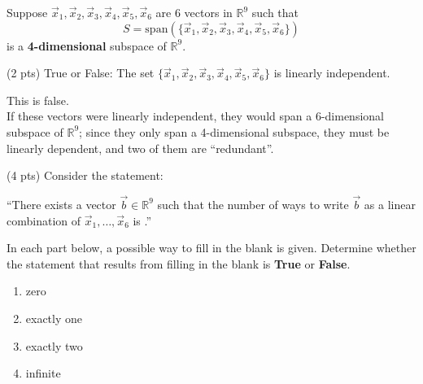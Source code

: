 \documentclass[11pt]{article}
\begin{document}
\newpage

\begin{prob}[(14 pts)]
Suppose $\vec x_1, \vec x_2, \vec x_3, \vec x_4, \vec x_5, \vec x_6$ are 6 vectors in $\mathbb{R}^9$ such that $$S = \text{span}\left(\{\vec x_1, \vec x_2, \vec x_3, \vec x_4, \vec x_5, \vec x_6\}\right)$$ is a \textbf{4-dimensional} subspace of $\mathbb{R}^9$.

\begin{subprob}(2 pts) True or False: The set $\{\vec x_1, \vec x_2, \vec x_3, \vec x_4, \vec x_5, \vec x_6\}$ is linearly independent.

 

\begin{solution}
This is false. \\

If these vectors were linearly independent, they would span a 6-dimensional subspace of $\mathbb{R}^9$; since they only span a 4-dimensional subspace, they must be linearly dependent, and two of them are ``redundant''.
\end{solution}
\end{subprob}

\begin{subprob}(4 pts) Consider the statement: 

\begin{center}
``There exists a vector $\vec b \in \mathbb{R}^9$ such that the number of ways to write $\vec b$ as a linear combination of $\vec x_1, \ldots, \vec x_6$ is \underline{\phantom{xxx}}.''
\end{center}

In each part below, a possible way to fill in the blank is given. Determine whether the statement that results from filling in the blank is \textbf{True} or \textbf{False}.

\begin{enumerate}[label=(\roman*)]
    \item zero \\  
    \item exactly one \\  
    \item exactly two \\  
    \item infinite \\  
\end{enumerate}


\end{subprob}
\end{prob}
\end{document}
